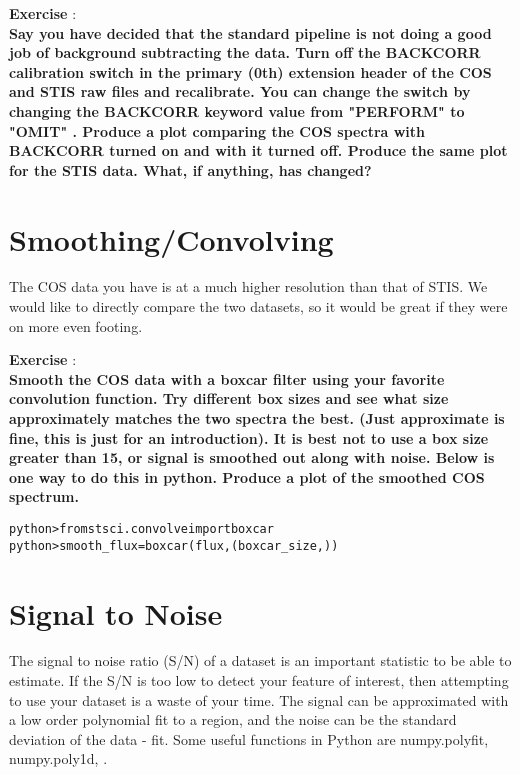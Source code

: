 {\bf \color{blue} Exercise  }:  \\
{ \bf Say you have decided that the standard pipeline is not doing a good job of background subtracting the data.  Turn off the BACKCORR calibration switch in the primary (0th) extension header of the COS and STIS raw files and recalibrate.  You can change the switch by changing the BACKCORR keyword value from "PERFORM" to "OMIT" {\color{red}{(Hint: There are many ways to do this, but if using python try using fits.setval)}}. Produce a plot comparing the COS spectra with BACKCORR turned on and with it turned off. Produce the same plot for the STIS data. What, if anything, has changed?} 
\section{Smoothing/Convolving}
The COS data you have is at a much higher resolution than that of STIS.  We would like to directly compare the two datasets, so it would be great if they were on more even footing.  

{\bf \color{blue} Exercise  }:  \\
{\bf Smooth the COS data with a boxcar filter using your favorite convolution function.  Try different box sizes and see what size approximately matches the two spectra the best.  (Just approximate is fine, this is just for an introduction). It is best not to use a box size greater than 15, or signal is smoothed out along with noise. Below is one way to do this in python. Produce a plot of the smoothed COS spectrum.}
\begin{alltt}
python> from stsci.convolve import boxcar
python> smooth_flux = boxcar(flux, (boxcar_size,) )
\end{alltt}



\section{Signal to Noise}
The signal to noise ratio (S/N) of a dataset is an important statistic to be able to estimate.  If the S/N is too low to detect your feature of interest, then attempting to use your dataset is a waste of your time. The signal can be approximated with a low order polynomial fit to a region, and the noise can be the standard deviation of the data - fit.  Some useful functions in Python are numpy.polyfit, numpy.poly1d, {\color{red}{and numpy.std}}. 

